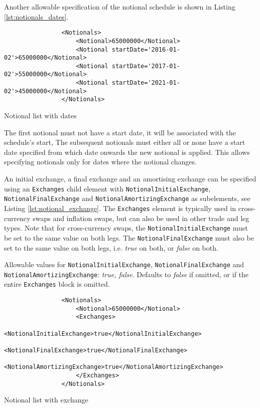 \begin{itemize}
Another allowable specification of the notional schedule is shown in Listing \ref{lst:notionals_dates}. 
\begin{listing}[H]
\begin{verbatim}
                <Notionals>
                    <Notional>65000000</Notional>
                    <Notional startDate='2016-01-02'>65000000</Notional>
                    <Notional startDate='2017-01-02'>55000000</Notional>
                    <Notional startDate='2021-01-02'>45000000</Notional>
                </Notionals>
\end{verbatim}
\caption{Notional list with dates}
\label{lst:notionals_dates}
\end{listing}
The first notional must not have a start date, it will be associated
with the schedule's start, The subsequent notionals must either all or none have a start
date specified from which date onwards the new notional is applied. This allows
specifying notionals only for dates where the notional changes. 

\vspace{1em} 

An initial exchange, a final exchange
and an amortising exchange can be specified using an \lstinline!Exchanges! child element with \break
\lstinline!NotionalInitialExchange!, \lstinline!NotionalFinalExchange! and \break
\lstinline!NotionalAmortizingExchange! as subelements, see Listing
\ref{lst:notional_exchange}. The \lstinline!Exchanges! element is typically used in cross-currency swaps and inflation swaps, but can also be used in other trade and leg types. Note that for cross-currency swaps, the \lstinline!NotionalInitialExchange! must be set to the same value on both legs. The \lstinline!NotionalFinalExchange! must also be set to the same value on both legs, i.e. \emph{true} on both, or \emph{false} on both.


Allowable values for \lstinline!NotionalInitialExchange!,  \lstinline!NotionalFinalExchange! and \lstinline!NotionalAmortizingExchange!:   \emph{true, false}. Defaults to  \emph{false} if omitted, or if the entire \lstinline!Exchanges! block is omitted.

\begin{listing}[H]
\begin{verbatim}
                <Notionals>
                    <Notional>65000000</Notional>
                    <Exchanges>
                      <NotionalInitialExchange>true</NotionalInitialExchange>
                      <NotionalFinalExchange>true</NotionalFinalExchange>
                      <NotionalAmortizingExchange>true</NotionalAmortizingExchange>
                    </Exchanges>
                </Notionals>
\end{verbatim}
\caption{Notional list with exchange}
\label{lst:notional_exchange}
\end{listing}


\end{itemize}
